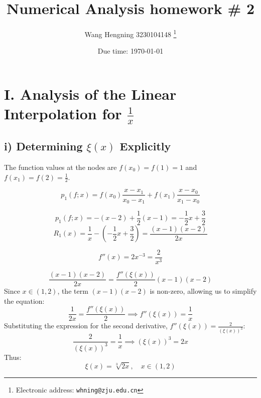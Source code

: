 \documentclass[a4paper]{article}
\begin{document}
\title{Numerical Analysis homework \# 2}
\author{Wang Hengning 3230104148
  \thanks{Electronic address: \texttt{whning@zju.edu.cn}}}


\date{Due time: \today}

\maketitle




\section*{I. Analysis of the Linear Interpolation for $\frac{1}{x}$}

\subsection*{i) Determining $\xi(x)$ Explicitly}

The function values at the nodes are $f(x_0) = f(1) = 1$ and $f(x_1) = f(2) = \frac{1}{2}$.

\[
p_1(f; x) = f(x_0)\frac{x-x_1}{x_0-x_1} + f(x_1)\frac{x-x_0}{x_1-x_0}
\]

\[
p_1(f; x) = -(x-2) + \frac{1}{2}(x-1) = -\frac{1}{2}x + \frac{3}{2}
\]
\[
R_1(x) = \frac{1}{x} - \left(-\frac{1}{2}x + \frac{3}{2}\right) = \frac{(x-1)(x-2)}{2x}
\]

\[
f''(x) = 2x^{-3} = \frac{2}{x^3}
\]

\[
\frac{(x-1)(x-2)}{2x} = \frac{f''(\xi(x))}{2}(x - 1)(x - 2)
\]
Since $x \in (1, 2)$, the term $(x-1)(x-2)$ is non-zero, allowing us to simplify the equation:
\[
\frac{1}{2x} = \frac{f''(\xi(x))}{2} \implies f''(\xi(x)) = \frac{1}{x}
\]
Substituting the expression for the second derivative, $f''(\xi(x)) = \frac{2}{(\xi(x))^3}$:
\[
\frac{2}{(\xi(x))^3} = \frac{1}{x} \implies (\xi(x))^3 = 2x
\]
Thus:
\[
\xi(x) = \sqrt[3]{2x}, \quad x \in (1, 2)
\]
\end{document}
